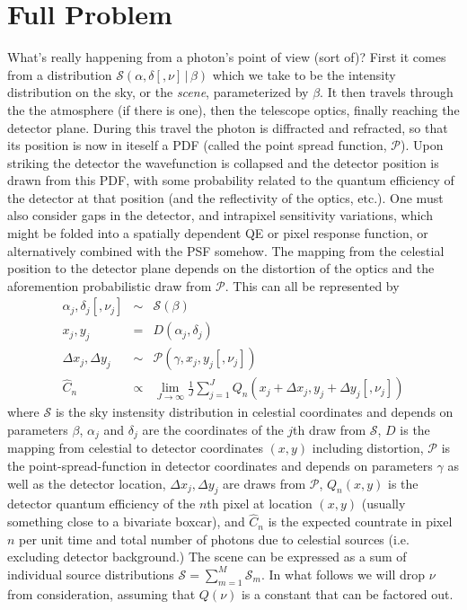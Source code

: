 \documentclass[modern]{aastex62}
\newcommand{\given}{\,|\,}
\newcommand{\countrate}{\hat{C}}
\newcommand{\psf}{\mathcal{P}}
\newcommand{\qe}{Q}
\newcommand{\scene}{\mathcal{S}}
\begin{document}
\section{Full Problem}

What's really happening from a photon's point of view (sort of)? First it comes
from a distribution $\scene(\alpha, \delta [, \nu] \given \beta)$ which we take
to be the intensity distribution on the sky, or the \emph{scene}, parameterized
by $\beta$. It then travels through the the atmosphere (if there is one), then
the telescope optics, finally reaching the detector plane. During this travel
the photon is diffracted and refracted, so that its position is now in iteself a
PDF (called the point spread function, $\psf$). Upon striking the detector the
wavefunction is collapsed and the detector position is drawn from this PDF, with
some probability related to the quantum efficiency of the detector at that
position (and the reflectivity of the optics, etc.). One must also consider gaps
in the detector, and intrapixel sensitivity variations, which might be folded
into a spatially dependent QE or pixel response function, or alternatively
combined with the PSF somehow. The mapping from the celestial position to the
detector plane depends on the distortion of the optics and the aforemention
probabilistic draw from $\psf$. This can all be represented by 
\begin{eqnarray}
\label{eqn:photon}
\alpha_j, \delta_j [, \nu_j] & \sim & \scene(\beta)\\
x_j, y_j & = & D(\alpha_j, \delta_j)  \nonumber \\ 
\Delta x_j, \Delta y_j & \sim & \psf(\gamma, x_j, y_j [, \nu_j]) \nonumber \\
\countrate_n & \propto & \lim_{J\to\infty} \frac{1}{J} \sum^J_{j=1} \qe_n(x_j+ \Delta x_j, y_j + \Delta y_j [, \nu_j]) \nonumber
\end{eqnarray}
where $\scene$ is the sky instensity distribution in celestial coordinates 
and depends on parameters $\beta$,
$\alpha_j$ and $\delta_j$ are the coordinates of the $j$th draw from $\scene$,
$D$ is the mapping from celestial to detector coordinates $(x, y)$ including distortion,
$\psf$ is the point-spread-function in detector coordinates and depends on parameters $\gamma$ as well as the detector location,
$\Delta x_j, \Delta y_j$ are draws from $\psf$,
$\qe_n(x, y)$ is the detector quantum efficiency of the $n$th pixel at location $(x, y)$ (usually something close to a bivariate boxcar),
and $\countrate_n$ is the expected countrate in pixel $n$ per unit time and total number of photons due to celestial sources (i.e. excluding detector background.)
The scene can be expressed as a sum of individual source distributions $\scene =
\sum_{m=1}^M \scene_m$. In what follows we will drop $\nu$ from consideration,
assuming that $\qe(\nu)$ is a constant that can be factored out.
\end{document}
